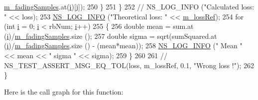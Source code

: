 \begin{DoxyCode}
      \hyperlink{classLteFadingTestCase_a80f3baa4e47676602f9becabc28fc975}{m\_fadingSamples}.at(\hyperlink{bernuolliDistribution_8m_a6f6ccfcf58b31cb6412107d9d5281426}{i})[j]);
250     \}
251   \}
252 \textcolor{comment}{//   NS\_LOG\_INFO ("Calculated loss: " << loss);}
253   \hyperlink{group__logging_gafbd73ee2cf9f26b319f49086d8e860fb}{NS\_LOG\_INFO} (\textcolor{stringliteral}{"Theoretical loss: "} << \hyperlink{classLteFadingTestCase_a6bdc7bd64691c8f657cf9810a4fc91db}{m\_lossRef});
254   \textcolor{keywordflow}{for} (\textcolor{keywordtype}{int} \hyperlink{bernuolliDistribution_8m_a6f6ccfcf58b31cb6412107d9d5281426}{i} = 0; \hyperlink{bernuolliDistribution_8m_a6f6ccfcf58b31cb6412107d9d5281426}{i} < rbNum; \hyperlink{bernuolliDistribution_8m_a6f6ccfcf58b31cb6412107d9d5281426}{i}++)
255     \{
256       \textcolor{keywordtype}{double} mean = sum.at (\hyperlink{bernuolliDistribution_8m_a6f6ccfcf58b31cb6412107d9d5281426}{i})/\hyperlink{classLteFadingTestCase_a80f3baa4e47676602f9becabc28fc975}{m\_fadingSamples}.size ();
257       \textcolor{keywordtype}{double} sigma = sqrt(sumSquared.at (\hyperlink{bernuolliDistribution_8m_a6f6ccfcf58b31cb6412107d9d5281426}{i})/\hyperlink{classLteFadingTestCase_a80f3baa4e47676602f9becabc28fc975}{m\_fadingSamples}.size () - (mean*mean));
258       \hyperlink{group__logging_gafbd73ee2cf9f26b319f49086d8e860fb}{NS\_LOG\_INFO} (\textcolor{stringliteral}{" Mean "} << mean << \textcolor{stringliteral}{" sigma "} << sigma);
259     \}
260   
261   \textcolor{comment}{//   NS\_TEST\_ASSERT\_MSG\_EQ\_TOL(loss, m\_lossRef, 0.1, "Wrong loss !");}
262 \}
\end{DoxyCode}


Here is the call graph for this function\+:


